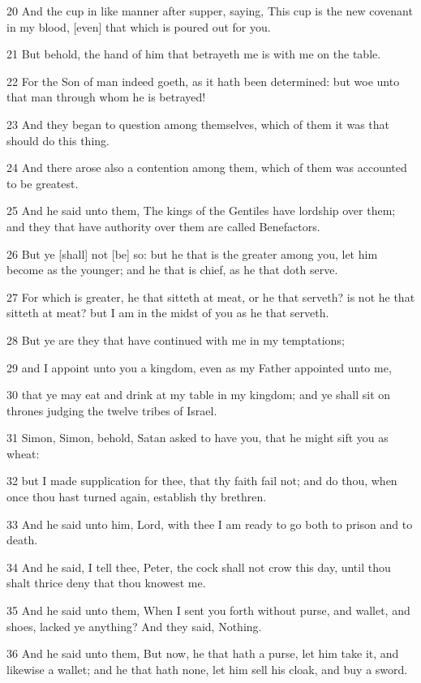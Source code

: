 \par 20 And the cup in like manner after supper, saying, This cup is the new covenant in my blood, [even] that which is poured out for you.
\par 21 But behold, the hand of him that betrayeth me is with me on the table.
\par 22 For the Son of man indeed goeth, as it hath been determined: but woe unto that man through whom he is betrayed!
\par 23 And they began to question among themselves, which of them it was that should do this thing.
\par 24 And there arose also a contention among them, which of them was accounted to be greatest.
\par 25 And he said unto them, The kings of the Gentiles have lordship over them; and they that have authority over them are called Benefactors.
\par 26 But ye [shall] not [be] so: but he that is the greater among you, let him become as the younger; and he that is chief, as he that doth serve.
\par 27 For which is greater, he that sitteth at meat, or he that serveth? is not he that sitteth at meat? but I am in the midst of you as he that serveth.
\par 28 But ye are they that have continued with me in my temptations;
\par 29 and I appoint unto you a kingdom, even as my Father appointed unto me,
\par 30 that ye may eat and drink at my table in my kingdom; and ye shall sit on thrones judging the twelve tribes of Israel.
\par 31 Simon, Simon, behold, Satan asked to have you, that he might sift you as wheat:
\par 32 but I made supplication for thee, that thy faith fail not; and do thou, when once thou hast turned again, establish thy brethren.
\par 33 And he said unto him, Lord, with thee I am ready to go both to prison and to death.
\par 34 And he said, I tell thee, Peter, the cock shall not crow this day, until thou shalt thrice deny that thou knowest me.
\par 35 And he said unto them, When I sent you forth without purse, and wallet, and shoes, lacked ye anything? And they said, Nothing.
\par 36 And he said unto them, But now, he that hath a purse, let him take it, and likewise a wallet; and he that hath none, let him sell his cloak, and buy a sword.
